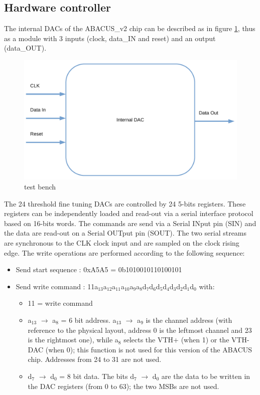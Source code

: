 \subsection{Hardware controller}\label{InternalDac}
\noindent The internal DACs of the ABACUS\_v2 chip can be described as in figure \ref{fig:internaldac}, thus as a module with 3 inputs (clock, data\_IN and reset) and an output (data\_OUT)\cite{dac}.
\begin{figure}[H]
	\centering
	\includegraphics[width=0.4\linewidth]{IMG/ch4/INTERNALDAC}
	\caption{test bench}
	\label{fig:internaldac}
\end{figure}
\noindent The 24 threshold fine tuning DACs are controlled by 24 5-bits registers. These registers can be independently
loaded and read-out via a serial interface protocol based on 16-bits words. The commands are send via a Serial
INput pin (SIN) and the data are read-out on a Serial OUTput pin (SOUT). The two serial streams are
synchronous to the CLK clock input and are sampled on the clock rising edge.
\newline
The write operations are performed according to the following sequence:
\begin{itemize}
	\item Send start sequence : 0xA5A5 = 0b1010010110100101
	\item Send write command : 11a$_{13}$a$_{12}$a$_{11}$a$_{10}$a$_{9}$a$_{8}$d$_{7}$d$_{6}$d$_{5}$d$_{4}$d$_{3}$d$_{2}$d$_{1}$d$_{0}$ with:
	\begin{itemize}
		\item 11 = write command
		\item a$_{13}$ $\rightarrow$ a$_{8}$ = 6 bit address. a$_{13}$ $\rightarrow$ a$_{9}$ is the channel address (with reference to the physical layout, address 0 is the leftmost channel and 23 is the rightmost one), while a$_{8}$ selects the VTH+ (when 1) or the VTH- DAC (when 0); this function is not used for this version of the ABACUS chip. Addresses from
		24 to 31 are not used.
		\item d$_{7}$ $\rightarrow$ d$_{0}$ = 8 bit data. The bits d$_{7}$ $\rightarrow$ d$_{0}$ are the data to be written in the DAC registers (from 0 to 63); the two MSBs are not used.
	\end{itemize}
\end{itemize}
